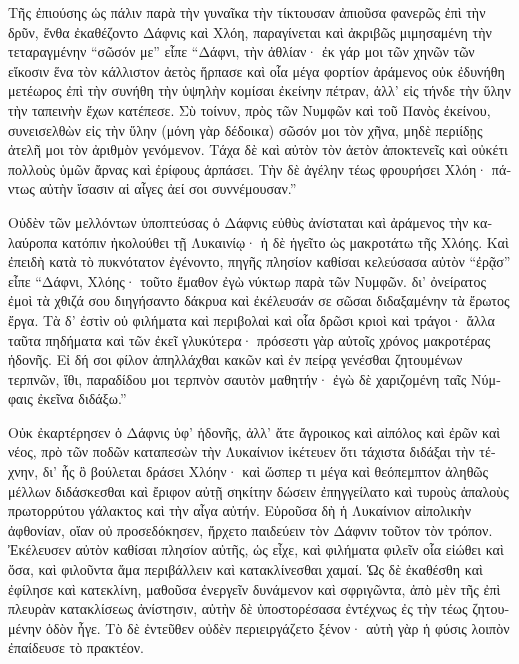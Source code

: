 \documentclass{book}
\begin{document}
\begin{pairs}
\begin{Leftside}
\begin{greek}
  Τῆς ἐπιούσης ὡς πάλιν παρὰ τὴν γυναῖκα τὴν τίκτουσαν ἀπιοῦσα φανερῶς ἐπὶ τὴν δρῦν, ἔνθα ἐκαθέζοντο Δάφνις καὶ Χλόη, παραγίνεται καὶ ἀκριβῶς  μιμησαμένη τὴν τεταραγμένην “σῶσόν με” εἶπε “Δάφνι, τὴν ἀθλίαν· ἐκ γάρ μοι τῶν χηνῶν τῶν εἴκοσιν ἕνα τὸν κάλλιστον ἀετὸς ἥρπασε καὶ οἷα μέγα φορτίον ἀράμενος οὐκ ἐδυνήθη μετέωρος ἐπὶ τὴν συνήθη τὴν ὑψηλὴν κομίσαι ἐκείνην πέτραν, ἀλλ’ εἰς τήνδε τὴν ὕλην τὴν ταπεινὴν ἔχων κατέπεσε.  Σὺ τοίνυν, πρὸς τῶν Νυμφῶν καὶ τοῦ Πανὸς ἐκείνου, συνεισελθὼν εἰς τὴν ὕλην (μόνη γὰρ δέδοικα) σῶσόν μοι τὸν χῆνα, μηδὲ περιίδῃς ἀτελῆ μοι τὸν ἀριθμὸν γενόμενον.  Τάχα δὲ καὶ αὐτὸν τὸν ἀετὸν ἀποκτενεῖς καὶ οὐκέτι πολλοὺς ὑμῶν ἄρνας καὶ ἐρίφους ἁρπάσει. Τὴν δὲ ἀγέλην τέως φρουρήσει Χλόη· πάντως αὐτὴν ἴσασιν αἱ αἶγες ἀεί σοι συννέμουσαν.”
\pend


  Οὐδὲν τῶν μελλόντων ὑποπτεύσας ὁ Δάφνις εὐθὺς ἀνίσταται καὶ ἀράμενος τὴν καλαύροπα κατόπιν ἠκολούθει τῇ Λυκαινίῳ· ἡ δὲ ἡγεῖτο ὡς μακροτάτω τῆς Χλόης. Καὶ ἐπειδὴ κατὰ τὸ πυκνότατον ἐγένοντο, πηγῆς πλησίον καθίσαι κελεύσασα αὐτὸν “ἐρᾷσ” εἶπε “Δάφνι, Χλόης· τοῦτο ἔμαθον ἐγὼ νύκτωρ παρὰ τῶν Νυμφῶν.  δι’ ὀνείρατος ἐμοὶ τὰ χθιζά σου διηγήσαντο δάκρυα καὶ ἐκέλευσάν σε σῶσαι διδαξαμένην τὰ ἔρωτος ἔργα. Τὰ δ’ ἐστὶν οὐ φιλήματα καὶ περιβολαὶ καὶ οἷα δρῶσι κριοὶ καὶ τράγοι· ἄλλα ταῦτα πηδήματα καὶ τῶν ἐκεῖ γλυκύτερα· πρόσεστι γὰρ αὐτοῖς χρόνος μακροτέρας ἡδονῆς.  Εἰ δή σοι φίλον ἀπηλλάχθαι κακῶν καὶ ἐν πείρᾳ γενέσθαι ζητουμένων τερπνῶν, ἴθι, παραδίδου μοι τερπνὸν σαυτὸν μαθητήν· ἐγὼ δὲ χαριζομένη ταῖς Νύμφαις ἐκεῖνα διδάξω.”
\pend


  Οὐκ ἐκαρτέρησεν ὁ Δάφνις ὑφ’ ἡδονῆς, ἀλλ’ ἅτε ἄγροικος καὶ αἰπόλος καὶ ἐρῶν καὶ νέος, πρὸ τῶν ποδῶν καταπεσὼν τὴν Λυκαίνιον ἱκέτευεν ὅτι τάχιστα διδάξαι τὴν τέχνην, δι’ ἧς ὃ βούλεται δράσει Χλόην·  καὶ ὥσπερ τι μέγα καὶ θεόπεμπτον ἀληθῶς μέλλων διδάσκεσθαι καὶ ἔριφον αὐτῇ σηκίτην δώσειν ἐπηγγείλατο καὶ τυροὺς ἁπαλοὺς πρωτορρύτου γάλακτος καὶ τὴν αἶγα αὐτήν.  Εὑροῦσα δὴ ἡ Λυκαίνιον αἰπολικὴν ἀφθονίαν, οἵαν οὐ προσεδόκησεν, ἤρχετο παιδεύειν τὸν Δάφνιν τοῦτον τὸν τρόπον. Ἐκέλευσεν αὐτὸν καθίσαι πλησίον αὐτῆς, ὡς εἶχε, καὶ φιλήματα φιλεῖν οἷα εἰώθει καὶ ὅσα, καὶ φιλοῦντα ἅμα περιβάλλειν καὶ κατακλίνεσθαι χαμαί.  Ὡς δὲ ἐκαθέσθη καὶ ἐφίλησε καὶ κατεκλίνη, μαθοῦσα ἐνεργεῖν δυνάμενον καὶ σφριγῶντα, ἀπὸ μὲν τῆς ἐπὶ πλευρὰν κατακλίσεως ἀνίστησιν, αὑτὴν δὲ ὑποστορέσασα ἐντέχνως ἐς τὴν τέως ζητουμένην ὁδὸν ἦγε. Τὸ δὲ ἐντεῦθεν οὐδὲν περιειργάζετο ξένον· αὐτὴ γὰρ ἡ φύσις λοιπὸν ἐπαίδευσε τὸ πρακτέον.
\pend



\end{greek}
\end{Leftside}
\end{pairs}
\end{document}
